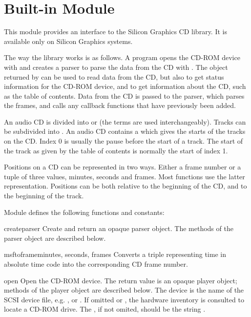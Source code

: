 \section{Built-in Module }



This module provides an interface to the Silicon Graphics CD library.
It is available only on Silicon Graphics systems.

The way the library works is as follows.  A program opens the CD-ROM
device with  and creates a parser to parse the data
from the CD with .  The object returned by
 can be used to read data from the CD, but also to get
status information for the CD-ROM device, and to get information about
the CD, such as the table of contents.  Data from the CD is passed to
the parser, which parses the frames, and calls any callback
functions that have previously been added.

An audio CD is divided into  or  (the terms
are used interchangeably).  Tracks can be subdivided into
.  An audio CD contains a  which
gives the starts of the tracks on the CD.  Index 0 is usually the
pause before the start of a track.  The start of the track as given by
the table of contents is normally the start of index 1.

Positions on a CD can be represented in two ways.  Either a frame
number or a tuple of three values, minutes, seconds and frames.  Most
functions use the latter representation.  Positions can be both
relative to the beginning of the CD, and to the beginning of the
track.

Module  defines the following functions and constants:


\begin{funcdesc}{createparser}{}
Create and return an opaque parser object.  The methods of the parser
object are described below.
\end{funcdesc}

\begin{funcdesc}{msftoframe}{minutes, seconds, frames}
Converts a  triple
representing time in absolute time code into the corresponding CD
frame number.
\end{funcdesc}

\begin{funcdesc}{open}{}
Open the CD-ROM device.  The return value is an opaque player object;
methods of the player object are described below.  The device is the
name of the SCSI device file, e.g. , or
.  If omitted or , the hardware inventory is
consulted to locate a CD-ROM drive.  The , if not omited,
should be the string .
\end{funcdesc}

